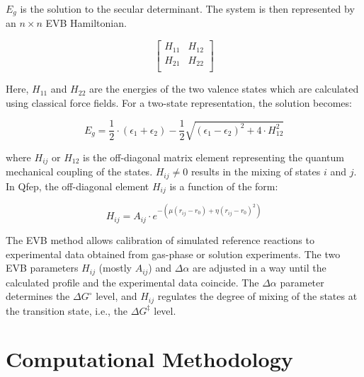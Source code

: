 \documentclass{article}
\begin{document}
\(E_g\) is the solution to the secular determinant. The system is then represented by an \(n \times n\) EVB Hamiltonian.

\[ 
  \left[ {\begin{array}{cc}
    H_{11} & H_{12} \\
    H_{21} & H_{22} \\
  \end{array} } \right]
\]

Here, \(H_{11}\) and \(H_{22}\) are the energies of the two valence states which are calculated using classical force fields. 
For a two-state representation, the solution becomes:

\begin{equation}
    E_g = \frac{1}{2} \cdot \left( \epsilon_1 + \epsilon_2 \right) - \frac{1}{2} \sqrt{ \left( \epsilon_1 - \epsilon_2 \right)^2 + 4 \cdot H_{12}^2 }
\end{equation}

where \(H_{ij}\) or \(H_{12}\) is the off-diagonal matrix element representing the quantum mechanical coupling of the states. \(H_{ij} \neq 0\) results in the mixing of states \(i\) and \(j\). In Qfep, the off-diagonal element \(H_{ij}\) is a function of the form:

\begin{equation}
    H_{ij} = A_{ij} \cdot e^{-(\mu (r_{ij} - r_0) + \eta (r_{ij} - r_0)^2)}
\end{equation}

The EVB method allows calibration of simulated reference reactions to experimental data obtained from gas-phase or solution experiments. The two EVB parameters \(H_{ij}\) (mostly \(A_{ij}\)) and \(\Delta \alpha\) are adjusted in a way until the calculated profile and the experimental data coincide. The \(\Delta \alpha\) parameter determines the \(\Delta G^\circ\) level, and \(H_{ij}\) regulates the degree of mixing of the states at the transition state, i.e., the \(\Delta G^\ddagger\) level.


\section{Computational Methodology}
\end{document}
